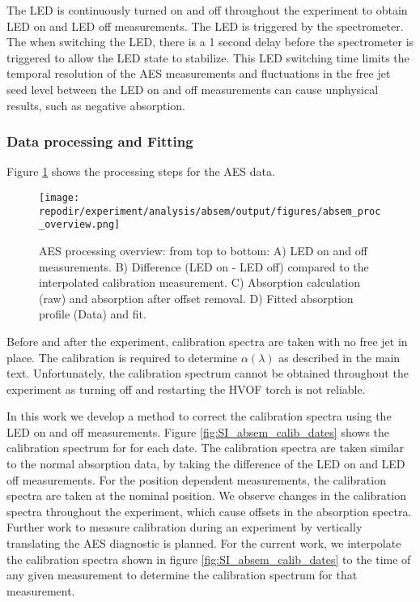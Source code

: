 The LED is continuously turned on and off throughout the experiment to obtain LED on and LED off measurements. The LED is triggered by the spectrometer. The when switching the LED, there is a 1 second delay before the spectrometer is triggered to allow the LED state to stabilize. This LED switching time limits the temporal resolution of the AES measurements and fluctuations in the free jet seed level between the LED on and off measurements can cause unphysical results, such as negative absorption. 

\subsubsection{Data processing and Fitting}

Figure \ref{fig:SI_AES_proc_overview} shows the processing steps for the AES data.

\begin{figure}[]
    \centering
    \texttt{[image: \\repodir/experiment/analysis/absem/output/figures/absem\_proc\_overview.png]}
    \caption{AES processing overview: from top to bottom: A) LED on and off measurements. B) Difference (LED on - LED off) compared to the interpolated calibration measurement. C) Absorption calculation (raw) and absorption after offset removal. D) Fitted absorption profile (Data) and fit.}
    \label{fig:SI_AES_proc_overview}
\end{figure}


Before and after the experiment, calibration spectra are taken with no free jet in place. The calibration is required to determine $\alpha(\lambda)$ as described in the main text. Unfortunately, the calibration spectrum cannot be obtained throughout the experiment as turning off and restarting the HVOF torch is not reliable.  

In this work we develop a method to correct the calibration spectra using the LED on and off measurements. Figure \ref{fig:SI_absem_calib_dates} shows the calibration spectrum for for each date. The calibration spectra are taken similar to the normal absorption data, by taking the difference of the LED on and LED off measurements. For the position dependent measurements, the calibration spectra are taken at the nominal position. We observe changes in the calibration spectra throughout the experiment, which cause offsets in the absorption spectra. Further work to measure calibration during an experiment by vertically translating the AES diagnostic is planned. For the current work, we interpolate the calibration spectra shown in figure \ref{fig:SI_absem_calib_dates} to the time of any given measurement to determine the calibration spectrum for that measurement. 

